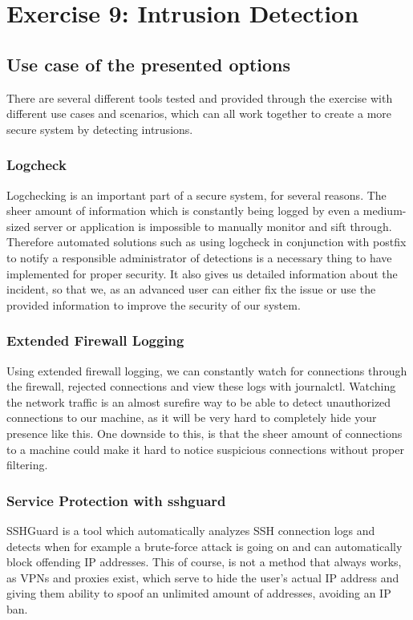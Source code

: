 \section{Exercise 9: Intrusion Detection}
\subsection{Use case of the presented options}
There are several different tools tested and provided through the exercise with different use cases and scenarios, which can all work together to create a more secure system by detecting intrusions.
\subsubsection{Logcheck}
Logchecking is an important part of a secure system, for several reasons. The sheer amount of information which is constantly being logged by even a medium-sized server or application is impossible to manually monitor and sift through. Therefore automated solutions such as using logcheck in conjunction with postfix to notify a responsible administrator of detections is a necessary thing to have implemented for proper security. It also gives us detailed information about the incident, so that we, as an advanced user can either fix the issue or use the provided information to improve the security of our system.

\subsubsection{Extended Firewall Logging}
Using extended firewall logging, we can constantly watch for connections through the firewall, rejected connections and view these logs with journalctl. Watching the network traffic is an almost surefire way to be able to detect unauthorized connections to our machine, as it will be very hard to completely hide your presence like this. One downside to this, is that the sheer amount of connections to a machine could make it hard to notice suspicious connections without proper filtering.

\subsubsection{Service Protection with sshguard}
SSHGuard is a tool which automatically analyzes SSH connection logs and detects when for example a brute-force attack is going on and can automatically block offending IP addresses. This of course, is not a method that always works, as VPNs and proxies exist, which serve to hide the user's actual IP address and giving them ability to spoof an unlimited amount of addresses, avoiding an IP ban.

